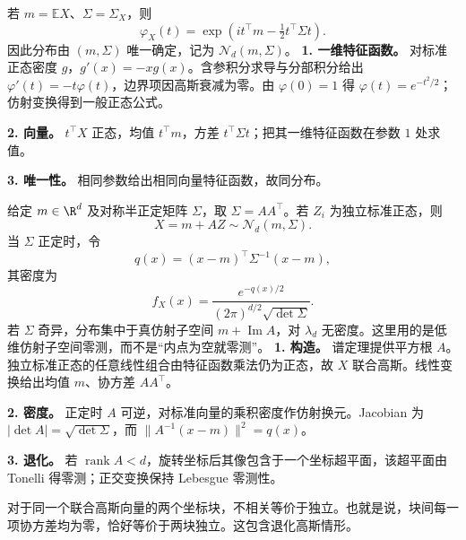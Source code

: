 若 $m=\mathbb EX$、$\Sigma=\Sigma_X$，则
\[
\varphi_X(t)=\exp\!\left(it^\top m-\tfrac12t^\top\Sigma t\right).
\]
因此分布由 $(m,\Sigma)$ 唯一确定，记为 $\mathcal N_d(m,\Sigma)$。
\textbf{1. 一维特征函数。} 对标准正态密度 $g$，$g'(x)=-xg(x)$。含参积分求导与分部积分给出 $\varphi'(t)=-t\varphi(t)$，边界项因高斯衰减为零。由 $\varphi(0)=1$ 得 $\varphi(t)=e^{-t^2/2}$；仿射变换得到一般正态公式。

\textbf{2. 向量。} $t^\top X$ 正态，均值 $t^\top m$，方差 $t^\top\Sigma t$；把其一维特征函数在参数 $1$ 处求值。

\textbf{3. 唯一性。} 相同参数给出相同向量特征函数，故同分布。

给定 $m\in\R^d$ 及对称半正定矩阵 $\Sigma$，取 $\Sigma=AA^\top$。若 $Z_i$ 为独立标准正态，则
\[
X=m+AZ\sim\mathcal N_d(m,\Sigma).
\]
当 $\Sigma$ 正定时，令
\[
q(x)=(x-m)^\top\Sigma^{-1}(x-m),
\]
其密度为
\[
f_X(x)=\frac{e^{-q(x)/2}}
{(2\pi)^{d/2}\sqrt{\det\Sigma}}.
\]
若 $\Sigma$ 奇异，分布集中于真仿射子空间 $m+\operatorname{Im}A$，对 $\lambda_d$ 无密度。这里用的是低维仿射子空间零测，而不是“内点为空就零测”。
\textbf{1. 构造。} 谱定理提供平方根 $A$。独立标准正态的任意线性组合由特征函数乘法仍为正态，故 $X$ 联合高斯。线性变换给出均值 $m$、协方差 $AA^\top$。

\textbf{2. 密度。} 正定时 $A$ 可逆，对标准向量的乘积密度作仿射换元。Jacobian 为 $|\det A|=\sqrt{\det\Sigma}$，而 $\|A^{-1}(x-m)\|^2=q(x)$。

\textbf{3. 退化。} 若 $\operatorname{rank}A<d$，旋转坐标后其像包含于一个坐标超平面，该超平面由 Tonelli 得零测；正交变换保持 Lebesgue 零测性。

对于同一个联合高斯向量的两个坐标块，不相关等价于独立。也就是说，块间每一项协方差均为零，恰好等价于两块独立。这包含退化高斯情形。

